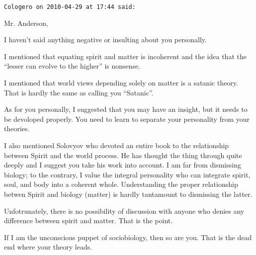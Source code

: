 \begin{footnotesize}
\begin{sffamily}
\texttt{Cologero on 2010-04-29 at 17:44 said:}

Mr. Anderson,

I haven't said anything negative or insulting about you personally.

I mentioned that equating spirit and matter is incoherent and the idea that the ``lesser can evolve to the higher'' is nonsense.

I mentioned that world views depending solely on matter is a satanic theory. That is hardly the same as calling you ``Satanic''.

As for you personally, I suggested that you may have an insight, but it needs to be devoloped properly. You need to learn to separate your personality from your theories.

I also mentioned Solovyov who devoted an entire book to the relationship between Spirit and the world process. He has thought the thing through quite deeply and I suggest you take his work into account. I am far from dismissing biology; to the contrary, I value the integral personality who can integrate spirit, soul, and body into a coherent whole. Understanding the proper relationship betwen Spirit and biology (matter) is hardly tantamount to dismissing the latter.

Unfotrunately, there is no possibility of discussion with anyone who denies any difference between spirit and matter. That is the point.

If I am the unconscious puppet of sociobiology, then so are you. That is the dead end where your theory leads.

\end{sffamily}
\end{footnotesize}


